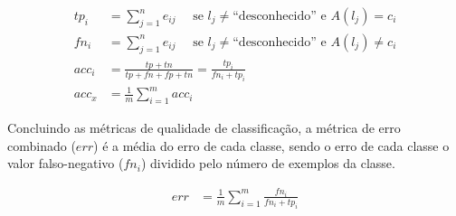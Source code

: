   \begin{align}
    tp_i            &= \sum_{j=1}^{n} e_{ij}        \quad \text{ se } l_j \neq \text{``desconhecido''} \text{ e } A(l_j) = c_i \label{eq:tpi}\\
    fn_i            &= \sum_{j=1}^{n} e_{ij}        \quad \text{ se } l_j \neq \text{``desconhecido''} \text{ e } A(l_j) \neq c_i \label{eq:fni}\\
    \mathit{acc}_i  &= \frac{tp + tn}{tp+fn+fp+tn}  = \frac{tp_i}{fn_i + tp_i} \label{eq:acci}\\
    \mathit{acc}_x & = \frac{1}{m} \sum_{i=1}^{m} \mathit{acc}_{i} \label{eq:acc}
  \end{align}

Concluindo as métricas de qualidade de classificação, a métrica de erro
combinado ($err$) é a média do erro de cada classe, sendo o erro de cada classe
o valor falso-negativo ($fn_i$) dividido pelo número de exemplos da classe.

\begin{align}
\mathit{err} &= \frac{1}{m} \sum_{i=1}^{m} \frac{fn_i}{fn_i + tp_i}
\end{align}




